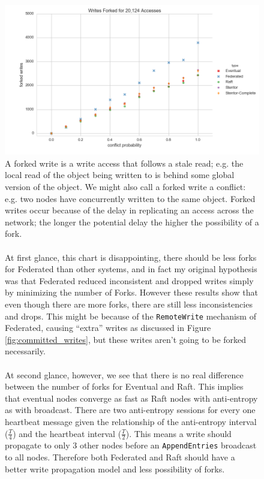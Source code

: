 \documentclass[11pt,letterpaper]{article}
\begin{document}
\begin{figure}[!h]
    \centering
        \includegraphics[width=\textwidth]{figures/forked_writes.png}
        \caption{\textsf{A forked write is a write access that follows a stale read; e.g. the local read of the object being written to is behind some global version of the object. We might also call a forked write a conflict: e.g. two nodes have concurrently written to the same object. Forked writes occur because of the delay in replicating an access across the network; the longer the potential delay the higher the possibility of a fork. \\
\\
        At first glance, this chart is disappointing, there should be less forks for Federated than other systems, and in fact my original hypothesis was that Federated reduced inconsistent and dropped writes simply by minimizing the number of Forks. However these results show that even though there are more forks, there are still less inconsistencies and drops. This might be because of the \texttt{RemoteWrite} mechanism of Federated, causing ``extra'' writes as discussed in Figure \ref{fig:committed_writes}, but these writes aren't going to be forked necessarily.\\
\\
        At second glance, however, we see that there is no real difference between the number of forks for Eventual and Raft. This implies that eventual nodes converge as fast as Raft nodes with anti-entropy as with broadcast. There are two anti-entropy sessions for every one heartbeat message given the relationship of the anti-entropy interval ($\frac {T} {4}$) and the heartbeat interval ($\frac {T} {2}$). This means a write should propagate to only 3 other nodes before an \texttt{AppendEntries} broadcast to all nodes. Therefore both Federated and Raft should have a better write propagation model and less possibility of forks.}}
        \label{fig:forked_writes}
\end{figure}
\end{document}
